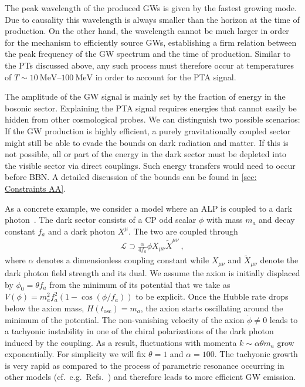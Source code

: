 \documentclass{article}
\begin{document}
The peak wavelength of the produced GWs is given by the fastest growing mode. Due to causality this wavelength is always smaller than the horizon at the time of production. On the other hand, the wavelength cannot be much larger in order for the mechanism to efficiently source GWs, establishing a firm relation between the peak frequency of the GW spectrum and the time of production. Similar to the PTs discussed above, any such process must therefore occur at temperatures of $T\sim\SIrange{10}{100}{\MeV}$ in order to account for the PTA signal.

The amplitude of the GW signal is mainly set by the fraction of energy in the bosonic sector. Explaining the PTA signal requires energies that cannot easily be hidden from other cosmological probes. We can distinguish two possible scenarios: If the GW production is highly efficient, a purely gravitationally coupled sector might still be able to evade the bounds on dark radiation and matter. If this is not possible, all or part of the energy in the dark sector must be depleted into the visible sector via direct couplings. Such energy transfers would need to occur before BBN. A detailed discussion of the bounds can be found in \cref{sec: Constraints AA}.

\bigskip 

As a concrete example, we consider a model where an ALP is coupled to a dark photon~\cite{Anber:2009ua,Barnaby:2012xt,Machado:2018nqk}. The dark sector consists of a CP odd scalar $\phi$ with mass $m_a$ and decay constant $f_a$ and a dark photon $X^{\mu}$. The two are coupled through
\begin{align}
    \mathcal{L}\supset \frac{\alpha}{4f_a} \phi X_{\mu\nu}\tilde X^{\mu\nu}~,
\end{align}
where $\alpha$ denotes a dimensionless coupling constant while $X_{\mu\nu}$ and $\tilde X_{\mu\nu}$ denote the dark photon field strength and its dual. We assume the axion is initially displaced by $\phi_0=\theta f_a$ from the minimum of its potential that we take as $V(\phi)=m_a^2 f_a^2 (1-\cos(\phi/f_a))$ to be explicit. Once the Hubble rate drops below the axion mass, $H(t_\mathrm{osc})=m_a$, the axion starts oscillating around the minimum of the potential. The non-vanishing velocity of the axion $\dot\phi\neq 0$ leads to a tachyonic instability in one of the chiral polarizations of the dark photon induced by the coupling.  As a result, fluctuations with momenta $k\sim \alpha\theta m_{a}$ grow exponentially. For simplicity we will fix $\theta=1$ and $\alpha=100$. The tachyonic growth is very rapid as compared to the process of parametric resonance occurring in other models (cf.\ e.g.\ Refs.~\cite{Figueroa:2016wxr,Chatrchyan:2020pzh}) and therefore leads to more efficient GW emission. 
\end{document}
